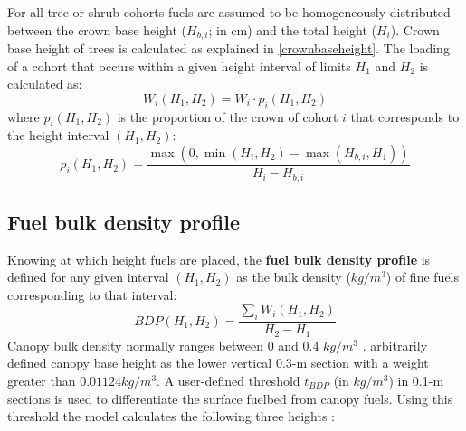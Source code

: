 \documentclass[]{book}
\begin{document}
For all tree or shrub cohorts fuels are assumed to be homogeneously distributed between the crown base height (\(H_{b,i}\); in cm) and the total height (\(H_i\)). Crown base height of trees is calculated as explained in \ref{crownbaseheight}. The loading of a cohort that occurs within a given height interval of limits \(H_1\) and \(H_2\) is calculated as:
\begin{equation}
W_i(H_1, H_2) = W_i\cdot p_i(H_1, H_2)
\end{equation}
where \(p_i(H_1, H_2)\) is the proportion of the crown of cohort \(i\) that corresponds to the height interval \((H_1, H_2)\):
\begin{equation}
p_i(H_1, H_2) = \frac{\max(0, \min(H_i, H_2) - \max(H_{b,i}, H_1))}{H_{i}-H_{b,i}}
\end{equation}

\hypertarget{fuel-bulk-density-profile}{%
\subsection{Fuel bulk density profile}\label{fuel-bulk-density-profile}}

Knowing at which height fuels are placed, the \textbf{fuel bulk density profile} \citep{Reinhardt2006} is defined for any given interval \((H_1, H_2)\) as the bulk density (\(kg/m^3\)) of fine fuels corresponding to that interval:
\begin{equation}
BDP(H_1, H_2) = \frac{\sum_{i} W_i(H_1, H_2)}{H_2-H_1}
\end{equation}
Canopy bulk density normally ranges between 0 and 0.4 \(kg/m^3\) \citep{Scott2002}. \citet{Sando1972} arbitrarily defined canopy base height as the lower vertical 0.3-m section with a weight greater than \(0.01124 kg/m^3\). A user-defined threshold \(t_{BDP}\) (in \(kg/m^3\)) in 0.1-m sections is used to differentiate the surface fuelbed from canopy fuels. Using this threshold the model calculates the following three heights \citep{Reinhardt2006}:
\end{document}

